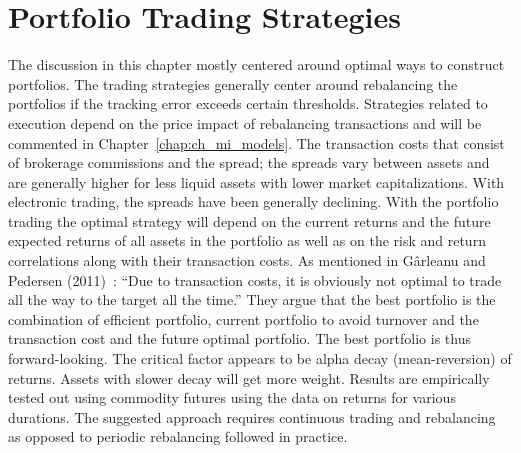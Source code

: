 \section{Portfolio Trading Strategies}


The discussion in this chapter mostly centered around optimal ways to construct portfolios. The trading strategies generally center around rebalancing the portfolios if the tracking error exceeds certain thresholds. Strategies related to execution depend on the price impact of rebalancing transactions and will be commented in Chapter~\ref{chap:ch_mi_models}. The transaction costs that consist of brokerage commissions and the spread; the spreads vary between assets and are generally higher for less liquid assets with lower market capitalizations. With electronic trading, the spreads have been generally declining. With the portfolio trading the optimal strategy will depend on the current returns and the future expected returns of all assets in the portfolio as well as on the risk and return correlations along with their transaction costs. As mentioned in G\^{a}rleanu and Pedersen (2011)~\cite{garlepede}: ``Due to transaction costs, it is obviously not optimal to trade all the way to the target all the time.'' They argue that the best portfolio is the combination of efficient portfolio, current portfolio to avoid turnover and the transaction cost and the future optimal portfolio. The best portfolio is thus forward-looking. The critical factor appears to be alpha decay (mean-reversion) of returns. Assets with slower decay will get more weight. Results are empirically tested out using commodity futures using the data on returns for various durations. The suggested approach requires continuous trading and rebalancing as opposed to periodic rebalancing followed in practice. 


